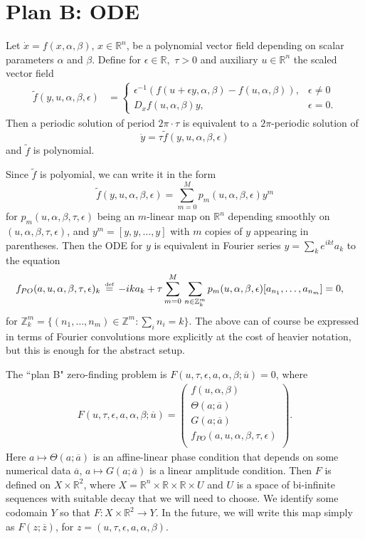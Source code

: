 \documentclass[10pt]{article}
\newcommand{\bydef}{\,\stackrel{\mbox{\tiny\textnormal{\raisebox{0ex}[0ex][0ex]{def}}}}{=}\,}
\newcommand{\R}{\mathbb{R}}
\newcommand{\Z}{\mathbb{Z}}
\begin{document}
\section{Plan B: ODE}
Let $\dot x=f(x,\alpha,\beta)$, $x\in\R^n$, be a polynomial vector field depending on scalar parameters $\alpha$ and $\beta$. Define for $\epsilon\in\R,$ $\tau>0$ and auxiliary $u\in\R^n$ the scaled vector field
\begin{align*}
\tilde f(y,u,\alpha,\beta,\epsilon)&=\left\{\begin{array}{ll}
\epsilon^{-1}(f(u+\epsilon y,\alpha,\beta)-f(u,\alpha,\beta)),&\epsilon\neq 0\\
D_xf(u,\alpha,\beta)y,&\epsilon=0.\end{array}\right.
\end{align*}
Then a periodic solution of period $2\pi\cdot\tau$ is equivalent to a $2\pi$-periodic solution of
$$\dot y = \tau\tilde f(y,u,\alpha,\beta,\epsilon)$$
and $\tilde f$ is polynomial.

Since $\tilde f$ is polyomial, we can write it in the form
$$\tilde f(y,u,\alpha,\beta,\epsilon) = \sum_{m=0}^Mp_m(u,\alpha,\beta,\epsilon)y^m$$
for $p_m(u,\alpha,\beta,\tau,\epsilon)$ being an $m$-linear map on $\R^n$ depending smoothly on $(u,\alpha,\beta,\tau,\epsilon)$, and $y^m=[y,y,\dots,y]$ with $m$ copies of $y$ appearing in parentheses. Then the ODE for $y$ is equivalent in Fourier series $y=\sum_k e^{ikt}a_k$ to the equation
\begin{align*}
f_{PO}(a,u,\alpha,\beta,\tau,\epsilon)_k&\bydef-ika_k + \tau\sum_{m=0}^M\hspace{0.5mm}\sum_{n\in \Z^m_k}p_m(u,\alpha,\beta,\epsilon)[a_{n_1},\dots,a_{n_m}]=0,
\end{align*}
for $\Z_k^m=\{(n_1,\dots,n_m)\in\Z^m : \sum_i n_i = k\}.$ The above can of course be expressed in terms of Fourier convolutions more explicitly at the cost of heavier notation, but this is enough for the abstract setup.

The ``plan B" zero-finding problem is $F(u,\tau,\epsilon,a,\alpha,\beta ; \overline u)=0$, where
\begin{align}\label{zfp-B}
F(u,\tau,\epsilon,a,\alpha,\beta; \overline u)=\left(\begin{array}{c}f(u,\alpha,\beta) \\ \Theta(a;\overline a) \\ G(a;\overline a) \\ f_{PO}(a,u,\alpha,\beta,\tau,\epsilon) \\  \end{array}\right).
\end{align}
Here $a\mapsto\Theta(a;\overline a)$ is an affine-linear phase condition that depends on some numerical data $\overline a$, $a\mapsto G(a;\overline a)$ is a linear amplitude condition. Then $F$ is defined on $X\times\R^2$, where $X=\R^n\times\R\times\R\times U$ and $U$ is a space of bi-infinite sequences with suitable decay that we will need to choose. We identify some codomain $Y$ so that $F:X\times\R^2\rightarrow Y$. In the future, we will write this map simply as $F(z;\overline z)$, for $z=(u,\tau,\epsilon,a,\alpha,\beta)$.
\end{document}

